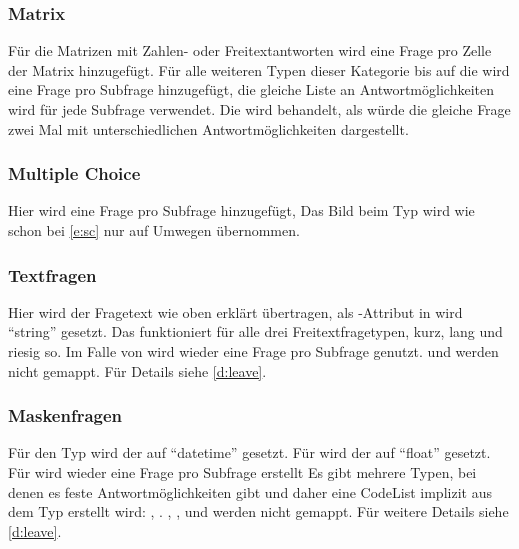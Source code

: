 \subsubsection{Matrix}

Für die Matrizen mit Zahlen- oder Freitextantworten wird eine Frage pro Zelle der Matrix hinzugefügt.
Für alle weiteren Typen dieser Kategorie bis auf die  wird eine Frage pro Subfrage hinzugefügt, die gleiche Liste an Antwortmöglichkeiten wird für jede Subfrage verwendet.
Die  wird behandelt, als würde die gleiche Frage zwei Mal mit unterschiedlichen Antwortmöglichkeiten dargestellt.

\subsubsection{Multiple Choice}

Hier wird eine Frage pro Subfrage hinzugefügt, %
Das Bild beim Typ  wird wie schon bei \cref{e:sc} nur auf Umwegen übernommen.

\subsubsection{Textfragen}

Hier wird der Fragetext wie oben erklärt übertragen, als -Attribut in  wird \enquote{string} gesetzt.
Das funktioniert für alle drei Freitextfragetypen, kurz, lang und riesig so.
Im Falle von  wird wieder eine Frage pro Subfrage genutzt.
 und  werden nicht gemappt. Für Details siehe \cref{d:leave}.

\subsubsection{Maskenfragen}

Für den Typ  wird der  auf \enquote{datetime} gesetzt.
Für  wird der  auf \enquote{float} gesetzt. %
Für  wird wieder eine Frage pro Subfrage erstellt %
Es gibt mehrere Typen, bei denen es feste Antwortmöglichkeiten gibt und daher eine CodeList implizit aus dem Typ erstellt wird:
, .
, ,  und  werden nicht gemappt. Für weitere Details siehe \cref{d:leave}.

